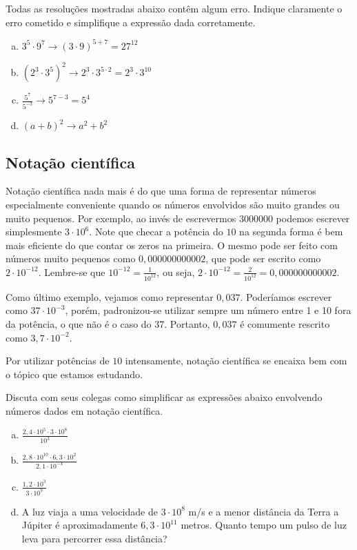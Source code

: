 \documentclass[main_estudante.tex]{subfiles}
\begin{document}
\begin{questao}
Todas as resoluções mostradas abaixo contêm algum erro. Indique claramente o erro cometido e simplifique a expressão dada corretamente.
\begin{enumerate}[a)]
\item $3^5 \cdot 9^7  \longrightarrow (3 \cdot 9)^{5+7} = 27^{12}$
\item $(2^3 \cdot 3^5)^2  \longrightarrow 2^3 \cdot 3^{5 \cdot 2} = 2^3 \cdot 3^{10}$
\item $\frac{5^7}{5^{-3}}  \longrightarrow 5^{7-3}=5^4$
\item $(a+b)^2 \longrightarrow a^2+b^2$
\end{enumerate}
\end{questao}

\subsection*{Notação científica}

Notação científica nada mais é do que uma forma de representar números especialmente conveniente quando os números envolvidos são muito grandes ou muito pequenos. Por exemplo, ao invés de escrevermos $3000000$ podemos escrever simplesmente $3 \cdot 10^6$. Note que checar a potência do $10$ na segunda forma é bem mais eficiente do que contar os zeros na primeira. O mesmo pode ser feito com números muito pequenos como $0,000000000002$, que pode ser escrito como $2 \cdot 10^{-12}$. Lembre-se que $10^{-12} = \frac{1}{10^12}$, ou seja, $2 \cdot 10^{-12} = \frac{2}{10^12} = 0,000000000002$.

Como último exemplo, vejamos como representar $0,037$. Poderíamos escrever como $37 \cdot 10^{-3}$, porém, padronizou-se utilizar sempre um número entre 1 e 10 fora da potência, o que não é o caso do 37. Portanto, $0,037$ é comumente rescrito como $3,7 \cdot 10^{-2}$.

Por utilizar potências de $10$ intensamente, notação científica se encaixa bem com o tópico que estamos estudando.

\begin{questao}
Discuta com seus colegas como simplificar as expressões abaixo envolvendo números dados em notação científica.
\begin{enumerate}[a)]
\item $\frac{2,4  \cdot 10^5 \cdot 3  \cdot 10^8}{10^3}$
\item $\frac{2,8  \cdot 10^{10} \cdot 6,3  \cdot 10^2}{2,1 \cdot 10^{-4}}$
\item $\frac{1,2  \cdot 10^3}{3 \cdot 10^9}$
\item A luz viaja a uma velocidade de $3 \cdot 10^8$ m/s e a menor distância da Terra a Júpiter é aproximadamente $6,3 \cdot 10^{11}$ metros. Quanto tempo um pulso de luz leva para percorrer essa distância?
\end{enumerate}
\end{questao}
\end{document}
